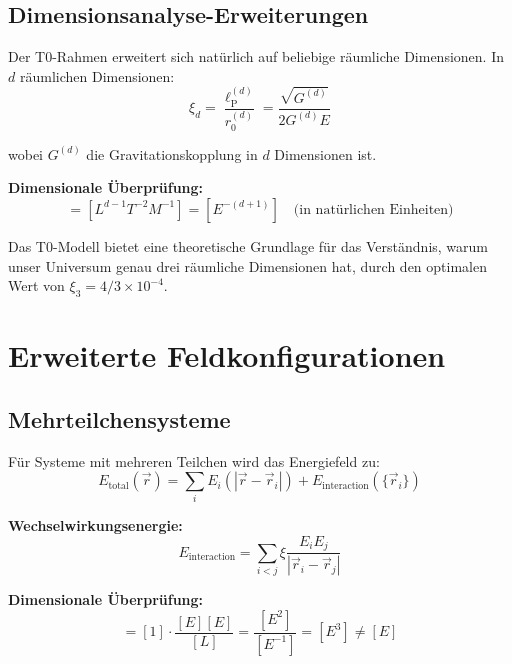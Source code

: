 \documentclass[12pt,a4paper]{report}
\newcommand{\lP}{\ell_{\text{P}}}         %
\begin{document}
	\subsection{Dimensionsanalyse-Erweiterungen}
	\label{subsec:dimensional_analysis}
	
	Der T0-Rahmen erweitert sich natürlich auf beliebige räumliche Dimensionen. In $d$ räumlichen Dimensionen:
	\begin{equation}
		\xi_d = \frac{\lP^{(d)}}{r_0^{(d)}} = \frac{\sqrt{G^{(d)}}}{2G^{(d)}E}
	\end{equation}
	
	wobei $G^{(d)}$ die Gravitationskopplung in $d$ Dimensionen ist.
	
	\textbf{Dimensionale Überprüfung:}
	\begin{equation}
		[G^{(d)}] = [L^{d-1} T^{-2} M^{-1}] = [E^{-(d+1)}] \quad \text{(in natürlichen Einheiten)}
	\end{equation}
	

	Das T0-Modell bietet eine theoretische Grundlage für das Verständnis, warum unser Universum genau drei räumliche Dimensionen hat, durch den optimalen Wert von $\xi_3 = 4/3 \times 10^{-4}$.
	
	\section{Erweiterte Feldkonfigurationen}
	\label{sec:advanced_configurations}
	
	\subsection{Mehrteilchensysteme}
	\label{subsec:multi_particle_systems}
	
	Für Systeme mit mehreren Teilchen wird das Energiefeld zu:
	\begin{equation}
		E_{\text{total}}(\vec{r}) = \sum_i E_i(|\vec{r} - \vec{r}_i|) + E_{\text{interaction}}(\{\vec{r}_i\})
	\end{equation}
	
	\textbf{Wechselwirkungsenergie:}
	\begin{equation}
		E_{\text{interaction}} = \sum_{i<j} \xi \frac{E_i E_j}{|\vec{r}_i - \vec{r}_j|}
	\end{equation}
	
	\textbf{Dimensionale Überprüfung:}
	\begin{equation}
		[E_{\text{interaction}}] = [1] \cdot \frac{[E][E]}{[L]} = \frac{[E^2]}{[E^{-1}]} = [E^3] \neq [E]
	\end{equation}
	
\end{document}

